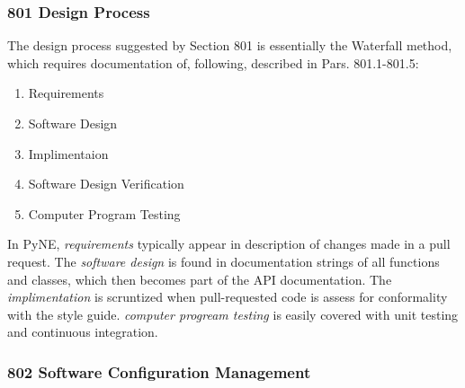 \documentclass{anstrans}
\begin{document}
\subsubsection{801 Design Process}

The design process suggested by Section 801 is essentially the Waterfall method, which requires documentation of, following, described in Pars. 801.1-801.5:
\begin{enumerate} 
\item{Requirements}
\item{Software Design}
\item{Implimentaion}
\item{Software Design Verification}
\item{Computer Program Testing}
\end{enumerate}

In PyNE, \emph{requirements} typically appear in description of changes made in
a pull request. The \emph{software design} is found in documentation strings of
all functions and classes, which then becomes part of the API documentation.
The \emph{implimentation} is scruntized when pull-requested code is assess for
conformality with the style guide. \emph{computer progream testing} is easily covered with unit testing and continuous integration.




\subsubsection{802 Software Configuration Management}
\end{document}

